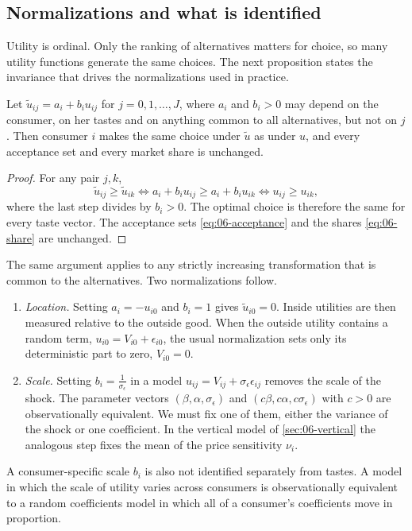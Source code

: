 \subsection{Normalizations and what is identified}\label{sec:06-normalization}

Utility is ordinal. Only the ranking of alternatives matters for choice, so many utility functions generate the
same choices. The next proposition states the invariance that drives the normalizations used in practice.

\begin{proposition}\label{prop:06-normalization}
Let $\tilde u_{ij} = a_i + b_i u_{ij}$ for $j = 0, 1, \dots, J$, where $a_i$ and $b_i > 0$ may depend on the
consumer, on her tastes and on anything common to all alternatives, but not on $j$. Then consumer $i$ makes the
same choice under $\tilde u$ as under $u$, and every acceptance set and every market share is unchanged.
\end{proposition}

\begin{proof}
For any pair $j, k$,
\begin{equation*}
\tilde u_{ij} \ge \tilde u_{ik}
\iff a_i + b_i u_{ij} \ge a_i + b_i u_{ik}
\iff u_{ij} \ge u_{ik},
\end{equation*}
where the last step divides by $b_i > 0$. The optimal choice is therefore the same for every taste vector. The
acceptance sets \eqref{eq:06-acceptance} and the shares \eqref{eq:06-share} are unchanged.
\end{proof}

The same argument applies to any strictly increasing transformation that is common to the alternatives. Two
normalizations follow.
\begin{enumerate}
  \item \emph{Location.} Setting $a_i = -u_{i0}$ and $b_i = 1$ gives $\tilde u_{i0} = 0$. Inside utilities are
  then measured relative to the outside good. When the outside utility contains a random term,
  $u_{i0} = V_{i0} + \epsilon_{i0}$, the usual normalization sets only its deterministic part to zero,
  $V_{i0} = 0$.
  \item \emph{Scale.} Setting $b_i = \frac{1}{\sigma_\epsilon}$ in a model $u_{ij} = V_{ij} + \sigma_\epsilon
  \epsilon_{ij}$ removes the scale of the shock. The parameter vectors $(\beta, \alpha, \sigma_\epsilon)$ and
  $(c\beta, c\alpha, c\sigma_\epsilon)$ with $c > 0$ are observationally equivalent. We must fix one of them,
  either the variance of the shock or one coefficient. In the vertical model of \cref{sec:06-vertical} the
  analogous step fixes the mean of the price sensitivity $\nu_i$.
\end{enumerate}
A consumer-specific scale $b_i$ is also not identified separately from tastes. A model in which the scale of
utility varies across consumers is observationally equivalent to a random coefficients model in which all of a
consumer's coefficients move in proportion.

